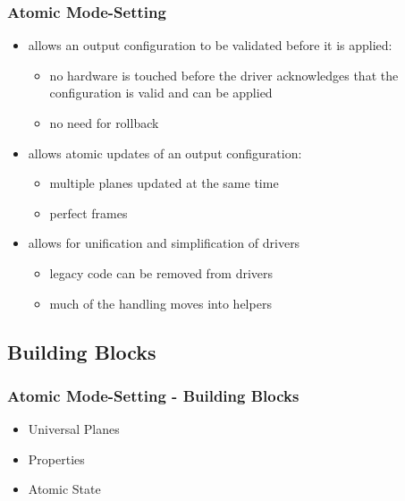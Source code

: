 \documentclass[t]{beamer}
\begin{document}
\begin{frame}
	\frametitle{Atomic Mode-Setting}
	\begin{itemize}
		\item allows an output configuration to be validated before it
			is applied:
			\begin{itemize}
				\item no hardware is touched before the driver acknowledges
					that the configuration is valid and can be applied
				\item no need for rollback
			\end{itemize}
		\item allows atomic updates of an output configuration:
			\begin{itemize}
				\item multiple planes updated at the same time
				\item perfect frames
			\end{itemize}
		\item allows for unification and simplification of drivers
			\begin{itemize}
				\item legacy code can be removed from drivers
				\item much of the handling moves into helpers
			\end{itemize}
	\end{itemize}
\end{frame}

\subsection{Building Blocks}

\begin{frame}
	\frametitle{Atomic Mode-Setting - Building Blocks}
	\begin{itemize}
		\item Universal Planes
		\item Properties
		\item Atomic State
	\end{itemize}
\end{frame}
\end{document}
